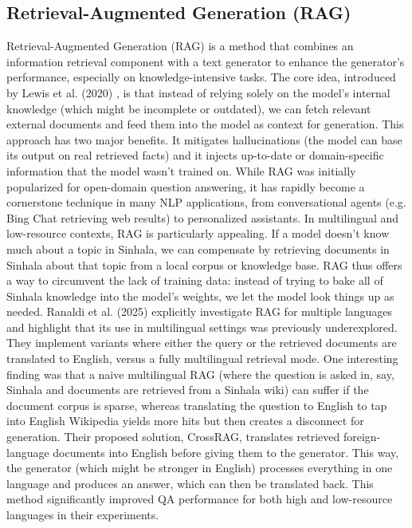 \documentclass[12pt]{uomthesis}
\begin{document}
\subsection{Retrieval-Augmented Generation (RAG)}
Retrieval-Augmented Generation (RAG) is a method that combines an information retrieval component with a text generator to enhance the generator’s performance, especially on knowledge-intensive tasks. The core idea, introduced by Lewis et al. (2020) \cite{28}, is that instead of relying solely on the model’s internal knowledge (which might be incomplete or outdated), we can fetch relevant external documents and feed them into the model as context for generation. This approach has two major benefits. It mitigates hallucinations (the model can base its output on real retrieved facts) and it injects up-to-date or domain-specific information that the model wasn’t trained on. While RAG was initially popularized for open-domain question answering, it has rapidly become a cornerstone technique in many NLP applications, from conversational agents (e.g. Bing Chat retrieving web results) to personalized assistants.
In multilingual and low-resource contexts, RAG is particularly appealing. If a model doesn’t know much about a topic in Sinhala, we can compensate by retrieving documents in Sinhala about that topic from a local corpus or knowledge base. RAG thus offers a way to circumvent the lack of training data: instead of trying to bake all of Sinhala knowledge into the model’s weights, we let the model look things up as needed. Ranaldi et al. (2025) \cite{18} explicitly investigate RAG for multiple languages and highlight that its use in multilingual settings was previously underexplored. They implement variants where either the query or the retrieved documents are translated to English, versus a fully multilingual retrieval mode. One interesting finding was that a naive multilingual RAG (where the question is asked in, say, Sinhala and documents are retrieved from a Sinhala wiki) can suffer if the document corpus is sparse, whereas translating the question to English to tap into English Wikipedia yields more hits but then creates a disconnect for generation. Their proposed solution, CrossRAG, translates retrieved foreign-language documents into English before giving them to the generator. This way, the generator (which might be stronger in English) processes everything in one language and produces an answer, which can then be translated back. This method significantly improved QA performance for both high and low-resource languages in their experiments. 
\end{document}
